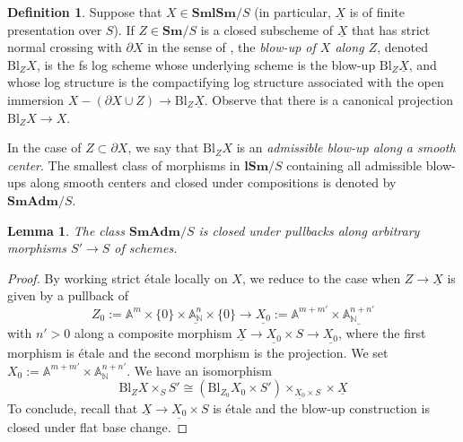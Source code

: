 \documentclass[11pt, a4paper]{amsart}
\newtheorem{lem}[thm]{Lemma}
\theoremstyle{definition}
\newtheorem{df}[thm]{Definition}
\numberwithin{equation}{subsection}
\newcommand{\N}{\mathbb{N}}
\newcommand{\A}{\mathbb{A}}
\newcommand{\Sm}{\mathbf{Sm}}
\newcommand{\lSm}{\mathbf{lSm}}
\newcommand{\SmlSm}{\mathbf{SmlSm}}
\newcommand{\Blow}{{\mathrm{Bl}}}
\newcommand{\SmAdm}{\mathbf{SmAdm}}
\renewcommand{\ul}{\underline}
\begin{document}
\begin{df}
\label{logH.35}
Suppose that $X\in \SmlSm/S$ (in particular, $\ul{X}$ is of finite presentation over $S$).
If $Z\in \Sm/S$ is a closed subscheme of $\ul{X}$ that has strict normal crossing
with $\partial X$ in the sense of \cite[Definition 7.2.1]{logDM}, 
the \emph{blow-up of $X$ along $Z$},  denoted 
$\Blow_Z X$,\index[notation]{BlZX @ $\Blow_Z X$} is the fs log scheme whose underlying scheme is the 
blow-up $\Blow_Z \ul{X}$, 
and whose log structure is the compactifying log structure associated with the open immersion 
$X-(\partial X\cup Z)\to \Blow_Z \ul{X}$.
Observe that there is a canonical projection $\Blow_Z X \to X$.

In the case of $Z\subset \partial X$, 
we say that $\Blow_Z X$ is an 
\emph{admissible blow-up along a smooth center}.
The smallest class of morphisms in $\lSm/S$ containing all admissible blow-ups along smooth centers 
and closed under compositions is denoted by $\SmAdm/S$.\index[notation]{SmAdm @ $\SmAdm/S$}
\end{df}

\begin{lem}
The class $\SmAdm/S$ is closed under pullbacks along arbitrary morphisms $S'\to S$ of schemes.
\end{lem}
\begin{proof}
By working strict \'etale locally on $X$,
we reduce to the case when $Z\to \ul{X}$ is given by a pullback of
\[
Z_0:=\A^m \times \{0\}\times \ul{\A_\N^n}\times \{0\} \to \ul{X_0}:=\A^{m+m'}\times \ul{\A_{\N}^{n+n'}}
\]
with $n'>0$ along a composite morphism $\ul{X}\to \ul{X_0}\times S\to \ul{X_0}$,
where the first morphism is \'etale and the second morphism is the projection.
We set $X_0:=\A^{m+m'}\times \A_{\N}^{n+n'}$.
We have an isomorphism
\[
\Blow_Z X\times_S S'
\cong
(\Blow_{Z_0} X_0 \times S')\times_{\ul{X_0}\times S}\times \ul{X} 
\]
To conclude,
recall that $\ul{X}\to \ul{X_0}\times S$ is \'etale and the blow-up construction is closed under flat base change.
\end{proof}
\end{document}
